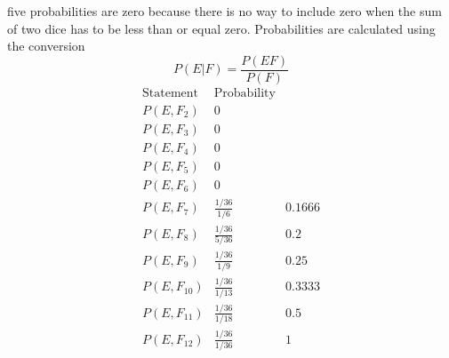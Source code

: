 \documentclass[10pt]{article}
\begin{document}
\begin{easylist}[enumerate]
    five probabilities are zero because there is no way to include zero when the sum of two dice has to be less than or
    equal zero. Probabilities are calculated using the conversion \[ P(E|F) = \frac{P(EF)}{P(F)} \]
        \[
            \begin{array}{ccc}
                \text{Statement} & \text{Probability} & \\
                P(E, F_2)        & 0                  & \\
                P(E, F_3)        & 0                  & \\
                P(E, F_4)        & 0                  & \\
                P(E, F_5)        & 0                  & \\
                P(E, F_6)        & 0                  & \\
                P(E, F_7)        & \frac{1/36}{1/6}   & 0.1666\\
                P(E, F_8)        & \frac{1/36}{5/36}  & 0.2\\
                P(E, F_9)        & \frac{1/36}{1/9}   & 0.25\\
                P(E, F_{10})     & \frac{1/36}{1/13}  & 0.3333\\
                P(E, F_{11})     & \frac{1/36}{1/18}  & 0.5\\
                P(E, F_{12})     & \frac{1/36}{1/36}  & 1\\
            \end{array}
        \]


\end{easylist}
\end{document}
